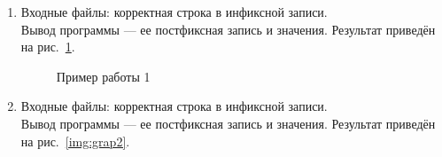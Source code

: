 \documentclass[12pt, a4paper]{article}
\begin{document}
\begin{enumerate}
	\item Входные файлы: корректная строка в инфиксной записи.\\
	Вывод программы --- ее постфиксная запись и значения. Результат 
	приведён на рис.~\ref{img:grap1}.
	\begin{figure}[h]
  		\caption{Пример работы 1}
  		\label{img:grap1}
	\end{figure}
	\item Входные файлы: корректная строка в инфиксной записи.\\
	Вывод программы --- ее постфиксная запись и значения.
	Результат приведён на рис.~\ref{img:grap2}.
	\begin{figure}[h]

\end{figure}
\end{enumerate}
\end{document}
